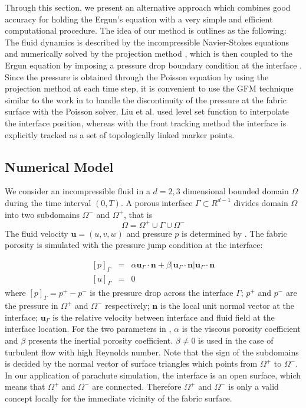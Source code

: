 Through this section, we present an alternative approach which combines 
good accuracy for holding the Ergun's equation with a very simple and efficient 
computational procedure. The idea of our method is 
outlines as the following: The fluid dynamics is 
described by the incompressible Navier-Stokes equations and numerically 
solved by the projection method \cite{KimMoin85}, 
which is then coupled to the Ergun equation \cite{nield2013} by imposing a pressure drop boundary condition at the interface \cite{caiazzo2011}. Since the pressure is obtained 
through the Poisson equation by using the projection method at each time step, 
it is convenient to use the GFM technique similar to the work in 
\cite{fedkiw1999,kang2000boundary,liu2000boundary} to handle the 
discontinuity of the pressure at the fabric surface with the Poisson 
solver. Liu et al. \cite{liu2000boundary} used level set function to 
interpolate the interface position, whereas with the front tracking method 
the interface is explicitly tracked as a set of topologically linked marker points.

\subsection{Numerical Model}
We consider an incompressible fluid in a $d = 2, 3$
dimensional bounded domain $\Omega$ during the time interval $(0,T)$. A porous
interface $\Gamma \subset R^{d-1}$ divides domain $\Omega$ into two subdomains
$\Omega^-$ and $\Omega^+$, that is
\begin{equation} \Omega = \Omega^+ \cup
\Gamma \cup \Omega^- \end{equation} The fluid velocity $\mathbf{u} = (u,v,w)$ and
pressure $p$ is determined by .
The fabric porosity is simulated with the pressure jump condition at the interface:

\begin{eqnarray} \label{jumpcond} {[p]}_{\Gamma} &=& \alpha
\mathbf{u}_\Gamma\cdot \mathbf{n} + \beta |\mathbf{u}_\Gamma\cdot \mathbf{n}|
\mathbf{u}_\Gamma\cdot \mathbf{n} \\
{[u]}_{\Gamma} &=& 0 \end{eqnarray}
where $[p]_{\Gamma}=p^+ - p^-$ is the
pressure drop across the interface $\Gamma$; $p^+$ and $p^-$ are the pressure in
$\Omega^+$ and $\Omega^-$ respectively; $\mathbf{n}$ is the local unit normal
vector at the interface; $\mathbf{u}_\Gamma$ is the relative velocity between
interface and fluid field at the interface location. For the two parameters in
, $\alpha$ is the viscous porosity coefficient and $\beta$ presents
the inertial porosity coefficient. $\beta \neq 0$ is used in the case of
turbulent flow with high Reynolds number.  Note that the sign of the subdomains
is decided by the normal vector of surface triangles which points from
$\Omega^+$ to $\Omega^-$.  In our application of parachute simulation, the
interface is an open surface, which means that $\Omega^+$ and $\Omega^-$ are
connected. Therefore $\Omega^+$ and $\Omega^-$ is only a valid concept locally
for the immediate vicinity of the fabric surface.

